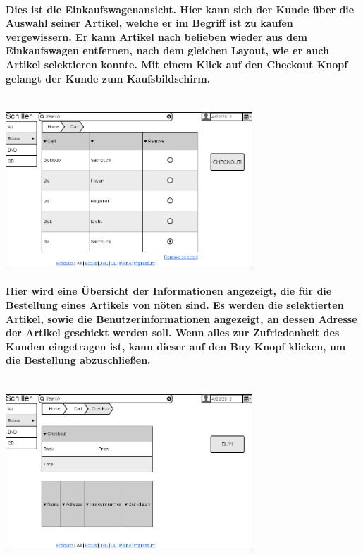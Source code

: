 \documentclass[a4paper]{article}
\begin{document}
\paragraph{Dies ist die Einkaufswagenansicht. Hier kann sich der Kunde über die Auswahl seiner Artikel, welche er im Begriff ist zu kaufen vergewissern. Er kann Artikel nach belieben wieder aus dem Einkaufswagen entfernen, nach dem gleichen Layout, wie er auch Artikel selektieren konnte. Mit einem Klick auf den Checkout Knopf gelangt der Kunde zum Kaufsbildschirm.\\ \\}
\includegraphics[width=350px]{8CartView.png}

\paragraph{Hier wird eine Übersicht der Informationen angezeigt, die für die Bestellung eines Artikels von nöten sind. Es werden die selektierten Artikel, sowie die Benutzerinformationen angezeigt, an dessen Adresse der Artikel geschickt werden soll. Wenn alles zur Zufriedenheit des Kunden eingetragen ist, kann dieser auf den Buy Knopf klicken, um die Bestellung abzuschließen.\\ \\}
\includegraphics[width=350px]{9CheckOut.png}
\end{document}
